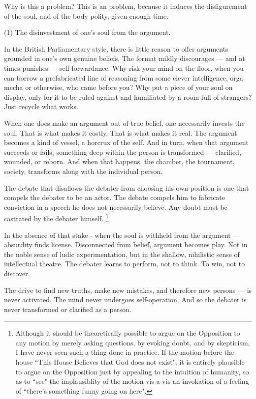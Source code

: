 \begin{itemize}
    Why is this a problem? This is an problem, because it induces the disfigurement of the soul, and of the body polity, given enough time.

(1) The disinvestment of one's soul from the argument. 

In the British Parliamentary style, there is little reason to offer arguments grounded in one’s own genuine beliefs. The format mildly discourages — and at times punishes — self-forwardance. Why risk your mind on the floor, when you can borrow a prefabricated line of reasoning from some clever intelligence, orga mecha or otherwise, who came before you? Why put a piece of your soul on display, only for it to be ruled against and humiliated by a room full of strangers? Just recycle what works.

When one does make an argument out of true belief, one necessarily invests the soul. That is what makes it costly. That is what makes it real. The argument becomes a kind of vessel, a horcrux of the self. And in turn, when that argument succeeds or fails, something deep within the person is transformed — clarified, wounded, or reborn. And when that happens, the chamber, the tournament, society, transforms along with the individual person.

The debate that disallows the debater from choosing his own position is one that compels the debater to be an actor. The debate compels him to fabricate conviction in a speech he does not necessarily believe. Any doubt must be castrated by the debater himself. \footnote{Although it should be theoretically possible to argue on the Opposition to any motion by merely asking questions, by evoking doubt, and by skepticism, I have never seen such a thing done in practice. If the motion before the house “This House Believes that God does not exist", it is entirely plausible to argue on the Opposition just by appealing to the intuition of humanity, so as to “see" the implausiblity of the motion vis-a-vis an invokation of a feeling of “there's something funny going on here".}

In the absence of that stake - when the soul is withheld from the argument — absurdity finds license. Disconnected from belief, argument becomes play. Not in the noble sense of ludic experimentation, but in the shallow, nihilistic sense of intellectual theatre. The debater learns to perform, not to think. To win, not to discover.

The drive to find new truths, make new mistakes, and therefore new persons — is never activated. The mind never undergoes self-operation. And so the debater is never transformed or clarified as a person.


\end{itemize}

